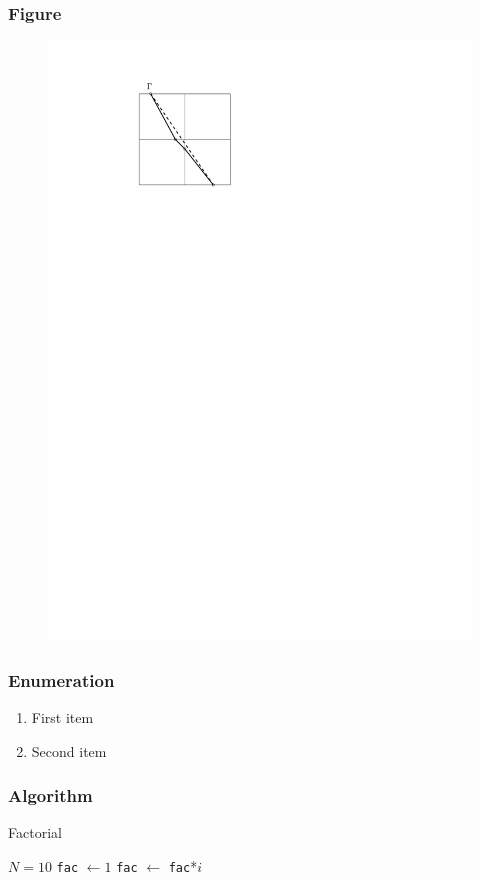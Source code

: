 \documentclass[hyperref={colorlinks=true,citecolor=green,linkcolor=red}]{beamer}
\begin{document}
\begin{frame}
   \frametitle{Figure}
   \begin{figure}
      \includegraphics[scale=1]{testPicture.pdf}
      \caption{}
      \label{fig:testFig}
   \end{figure}
\end{frame}


\begin{frame}
   \frametitle{Enumeration}
   \begin{enumerate}
      \item First item
      \item Second item
      \label{enum:testEnum}
   \end{enumerate}
\end{frame}


\begin{frame}
   \frametitle{Algorithm}
   \begin{algorithm}[H]
      \caption{Factorial}
      \label{alg:testAlg}
      \begin{algorithmic}[1]
         \State $N = 10$ 
         \State \texttt{fac} $\gets 1$ 
            \State \texttt{fac} $\gets$ \texttt{fac}*$i$
         \EndFor
      \end{algorithmic}
   \end{algorithm}
\end{frame}
\end{document}
